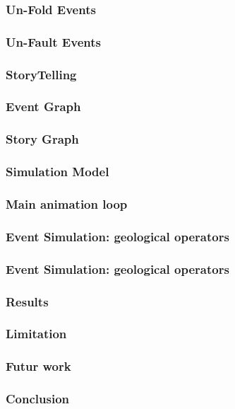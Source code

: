 \documentclass{beamer}
\begin{document}
	\begin{frame}
	\frametitle{Un-Fold Events}
	\end{frame}
	
	\begin{frame}
	\frametitle{Un-Fault Events}
	\end{frame}
	
	\begin{frame}
	\frametitle{StoryTelling}
	\end{frame}
	
	\begin{frame}
	\frametitle{Event Graph}
	\end{frame}
	
	\begin{frame}
	\frametitle{Story Graph}
	\end{frame}
	
	
	\begin{frame}
	\frametitle{Simulation Model}
	\end{frame}
	
	
	\begin{frame}
	\frametitle{Main animation loop}
	\end{frame}
	
	\begin{frame}
	\frametitle{Event Simulation:  geological operators}
	\end{frame}
	
	\begin{frame}
	\frametitle{Event Simulation:  geological operators}
	\end{frame}

	\begin{frame}
	\frametitle{Results}
	\end{frame}
	
	\begin{frame}
	\frametitle{Limitation}
	\end{frame}
	
	\begin{frame}
	\frametitle{Futur work}
	\end{frame}
	
	\begin{frame}
	\frametitle{Conclusion}
	\end{frame}
	

	
\end{document}
